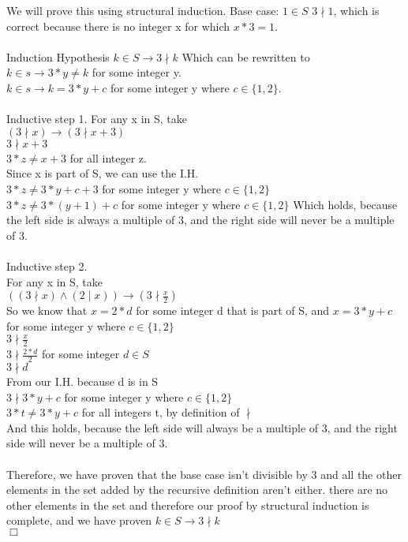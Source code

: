 \documentclass{article}
\begin{document}
We will prove this using structural induction.
Base case: $1 \in S$
$3 \nmid 1$, which is correct because there is no integer x for which $x*3=1$.\\
\\
Induction Hypothesis $k \in S \rightarrow 3 \nmid k$
Which can be rewritten to \\
$k \in s \rightarrow 3*y \neq k$ for some integer y.\\
$k \in s \rightarrow k = 3*y+c$ for some integer y where $c \in \{1,2\}$.\\
\\
Inductive step 1.
For any x in S, take\\
$(3 \nmid x) \rightarrow (3 \nmid x+3)$\\
$3 \nmid x+3$\\
$3*z \neq x+3$ for all integer z.\\
Since x is part of S, we can use the I.H.\\
$3*z \neq 3*y+c+3$ for some integer y where $c \in \{1,2\}$\\
$3*z \neq 3*(y+1)+c$ for some integer y where $c \in \{1,2\}$
Which holds, because the left side is always a multiple of 3, and the right side will never be a multiple of 3.\\
\\
Inductive step 2.\\
For any x in S, take\\
$((3 \nmid x) \land (2 \mid x))  \rightarrow (3 \nmid \frac{x}{2})$\\
So we know that $x=2*d$ for some integer d that is part of S, and $x = 3*y+c$ for some integer y where $c \in \{1,2\}$\\
$3 \nmid \frac{x}{2}$\\
$3 \nmid \frac{2*d}{2}$ for some integer $d \in S$\\
$3 \nmid d$\\
From our I.H. because d is in S\\
$3 \nmid 3*y+c$ for some integer y where $c \in \{1,2\}$\\
$3*t \neq 3*y+c$ for all integers t, by definition of $\nmid$\\
And this holds, because the left side will always be a multiple of 3, and the right side will never be a multiple of 3.\\
\\
Therefore, we have proven that the base case isn't divisible by 3 and all the other elements in the set added by the recursive definition aren't either. there are no other elements in the set and therefore our proof by structural induction is complete, and we have proven $k \in S \rightarrow 3 \nmid k$\\
$\Box$
\end{document}

